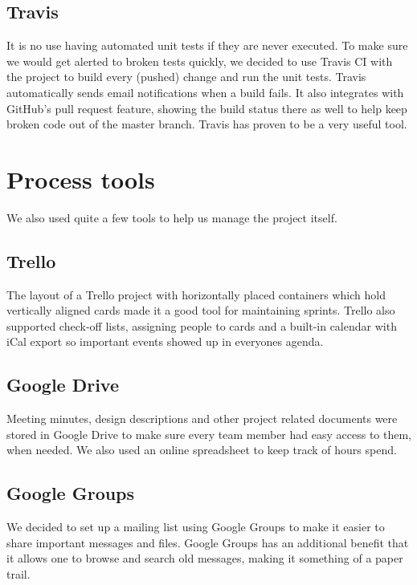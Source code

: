 \subsection{Travis}

It is no use having automated unit tests if they are never executed. To make sure we would get alerted to broken tests quickly, we decided to use Travis CI with the project to build every (pushed) change and run the unit tests. Travis automatically sends email notifications when a build fails. It also integrates with GitHub's pull request feature, showing the build status there as well to help keep broken code out of the master branch. Travis has proven to be a very useful tool.  

\section{Process tools}

We also used quite a few tools to help us manage the project itself.

\subsection{Trello}

The layout of a Trello project with horizontally placed containers which hold vertically aligned cards made it a good tool for maintaining sprints. Trello also supported check-off lists, assigning people to cards and a built-in calendar with iCal export so important events showed up in everyones agenda. 

\subsection{Google Drive}

Meeting minutes, design descriptions and other project related documents were stored in Google Drive to make sure every team member had easy access to them, when needed. We also used an online spreadsheet to keep track of hours spend. 

\subsection{Google Groups}

We decided to set up a mailing list using Google Groups to make it easier to share important messages and files. Google Groups has an additional benefit that it allows one to browse and search old messages, making it something of a paper trail. 

